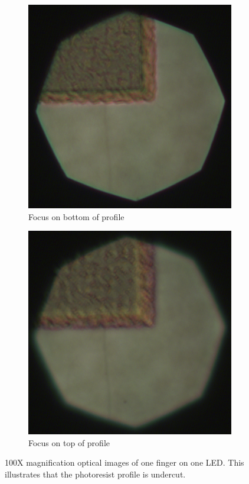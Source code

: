 \begin{figure}
    \centering
    \begin{subfigure}{0.49\linewidth}
        \centering
        \includegraphics[width=\textwidth]{figures/led_bottom_100x.png}
        \caption{Focus on bottom of profile}
        \label{fig:undercut_bot}
    \end{subfigure}
    \hfill
    \begin{subfigure}{0.49\linewidth}
        \centering
        \includegraphics[width=\textwidth]{figures/led_top_100x.png}
        \caption{Focus on top of profile}
        \label{fig:undercut_top}
    \end{subfigure}
    \caption{100X magnification optical images of one finger on one LED. 
    This illustrates that the photoresist profile is undercut.}
\end{figure}
